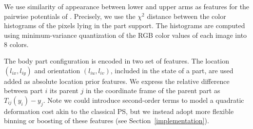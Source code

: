 We use similarity of appearance between lower and upper arms as features for 
the pairwise potentials of \CPS. Precisely, we use the $\chi^2$ distance 
between the color histograms of the pixels lying in the part support.  The 
histograms are computed using minimum-variance quantization of the RGB color 
values of each image into $8$ colors.

 The body part configuration is encoded in two set of features. 
The location $(l_{ix}, l_{iy})$ and orientation $(l_{iu}, l_{iv})$, included in 
the state of a part, are used added as absolute location prior features.  We 
express the relative difference between part $i$ its parent $j$ in the 
coordinate frame of the parent part as $T_{ij}(y_i) - y_j$.
Note we could introduce second-order terms to model a quadratic deformation cost akin to the classical PS, but we instead adopt more flexible binning or boosting of these features (see Section~\ref{implementation}).


